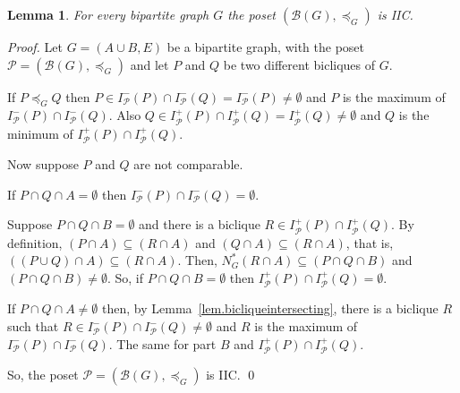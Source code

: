 \documentclass{article}
\newcommand{\margem}[2]
        {\mbox{}\marginpar{%
        \raggedright\textcolor{#2}{%
        \hspace{0pt}\bfseries\ssmall #1\\}}}
\newcommand{\comment}[3]{\margem{\textit{(#1)}\\ #3}{#2}}
\newcommand{\mB}{\ensuremath{\mathcal{B}}}
\newcommand{\mP}{\ensuremath{\mathcal{P}}}
\newtheorem{lemma}{Lemma}
\begin{document}
\begin{lemma}\label{lem.posetIIC}
  For  every   bipartite  graph  $G$   the  poset
  $(\mB(G), \preceq_G)$ is IIC.
\end{lemma}
\begin{proof}
  Let  $G  = (A  \cup  B,  E)$ be  a  bipartite  graph, with  the  poset
  $\mP = (\mB(G), \preceq_G)$ and let $P$ and $Q$ be two different bicliques
  of $G$.

  If             $P             \preceq_G            Q$             then
  $P \in  I_{\mP}^-(P) \cap I_{\mP}^-(Q) =  I_{\mP}^-(P) \neq \emptyset$
  and  $P$ is  the maximum  of $I_{\mP}^-(P)  \cap I_{\mP}^-(Q)$.   Also
  $Q \in  I_{\mP}^+(P) \cap I_{\mP}^+(Q) =  I_{\mP}^+(Q) \neq \emptyset$
  and $Q$ is the minimum of $I_{\mP}^+(P) \cap I_{\mP}^+(Q)$.

  Now suppose $P$ and $Q$ are not comparable.

  If     $P     \cap     Q      \cap     A     =     \emptyset$     then
  $I_{\mP}^-(P) \cap I_{\mP}^-(Q) = \emptyset$.

  Suppose  $P  \cap Q  \cap  B  = \emptyset$  and  there  is a  biclique
  $R    \in   I_{\mP}^+(P)    \cap   I_{\mP}^+(Q)$.     By   definition,
  $(P      \cap     A)      \subseteq      (R      \cap     A)$      and
  $(Q    \cap     A)    \subseteq     (R    \cap    A)$,     that    is,
  $((P   \cup   Q)    \cap   A)   \subseteq   (R    \cap   A)$.    Then,
  $N_G^*(R   \cap    A)   \subseteq   (P    \cap   Q   \cap    B)$   and
  $(P     \cap    Q     \cap    B)     \neq    \emptyset$.     So,    if
  $P      \cap      Q      \cap       B      =      \emptyset$      then
  $I_{\mP}^+(P) \cap I_{\mP}^+(Q) = \emptyset$.

  If    $P    \cap    Q    \cap   A    \neq    \emptyset$    then,    by
  Lemma~\ref{lem.bicliqueintersecting},  there is  a  biclique $R$  such
  that $R \in I_{\mP}^-(P) \cap  I_{\mP}^-(Q) \neq \emptyset$ and $R$ is
  the maximum of $I_{\mP}^-(P) \cap I_{\mP}^-(Q)$. The same for part $B$
  and $I_{\mP}^+(P) \cap I_{\mP}^+(Q)$.

  So, the poset $\mP = (\mB(G), \preceq_G)$ is IIC.
  \qed
\end{proof}
\end{document}
